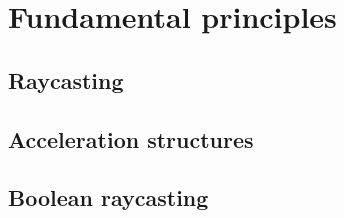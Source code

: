\section{Fundamental principles}

\subsection{Raycasting}

\subsection{Acceleration structures}

\subsection{Boolean raycasting}
